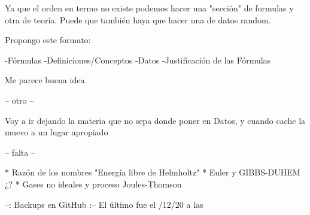 Ya que el orden en termo no existe podemos hacer una "sección" de formulas y otra de teoría. Puede que también haya que hacer una de datos random.

Propongo este formato:

-Fórmulas
-Definiciones/Conceptos
-Datos
-Justificación de las Fórmulas

Me parece buena idea

-- otro --

Voy a ir dejando la materia que no sepa donde poner en Datos, y cuando cache la muevo a un lugar apropiado

-- falta --

* Razón de los nombres "Energía libre de Helmholtz"
* Euler y GIBBS-DUHEM ¿?
* Gases no ideales y proceso Joules-Thomson


--: Backups en GitHub :--
El último fue el /12/20 a las 